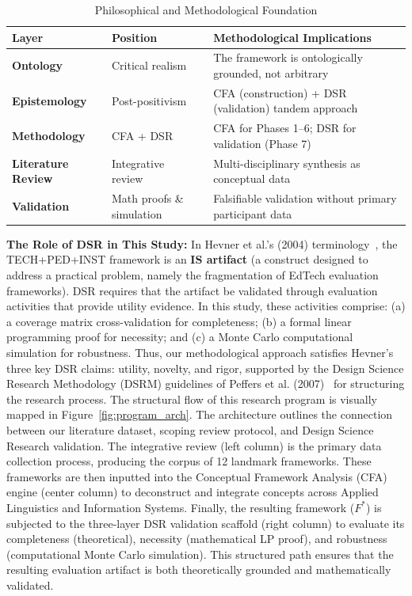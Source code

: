 \documentclass[11pt,a4paper]{article}
\begin{document}
\begin{table}[ht]
  \caption{Philosophical and Methodological Foundation}
  \label{tab:philosophy}
  \centering
  \renewcommand{\arraystretch}{1.3}
  \begin{tabular}{@{} L{3.5cm} L{4.5cm} L{6.5cm} @{} }
    \toprule
    \textbf{Layer} & \textbf{Position} & \textbf{Methodological Implications} \\
    \midrule
    \textbf{Ontology} & Critical realism & The framework is ontologically grounded, not arbitrary \\
    \textbf{Epistemology} & Post-positivism & CFA (construction) + DSR (validation) tandem approach \\
    \textbf{Methodology} & CFA + DSR & CFA for Phases 1--6; DSR for validation (Phase 7) \\
    \textbf{Literature Review} & Integrative review~\cite{b8} & Multi-disciplinary synthesis as conceptual data \\
    \textbf{Validation} & Math proofs \& simulation & Falsifiable validation without primary participant data \\
    \bottomrule
  \end{tabular}
\end{table}

\textbf{The Role of DSR in This Study:} In Hevner et al.'s (2004) terminology~\cite{b34}, the TECH+PED+INST framework is an \textbf{IS artifact} (a construct designed to address a practical problem, namely the fragmentation of EdTech evaluation frameworks). DSR requires that the artifact be validated through evaluation activities that provide utility evidence. In this study, these activities comprise: (a) a coverage matrix cross-validation for completeness; (b) a formal linear programming proof for necessity; and (c) a Monte Carlo computational simulation for robustness. Thus, our methodological approach satisfies Hevner's three key DSR claims: utility, novelty, and rigor, supported by the Design Science Research Methodology (DSRM) guidelines of Peffers et al. (2007)~\cite{b36} for structuring the research process. The structural flow of this research program is visually mapped in Figure~\ref{fig:program_arch}. The architecture outlines the connection between our literature dataset, scoping review protocol, and Design Science Research validation. The integrative review (left column) is the primary data collection process, producing the corpus of 12 landmark frameworks. These frameworks are then inputted into the Conceptual Framework Analysis (CFA) engine (center column) to deconstruct and integrate concepts across Applied Linguistics and Information Systems. Finally, the resulting framework ($F^*$) is subjected to the three-layer DSR validation scaffold (right column) to evaluate its completeness (theoretical), necessity (mathematical LP proof), and robustness (computational Monte Carlo simulation). This structured path ensures that the resulting evaluation artifact is both theoretically grounded and mathematically validated.
\end{document}
